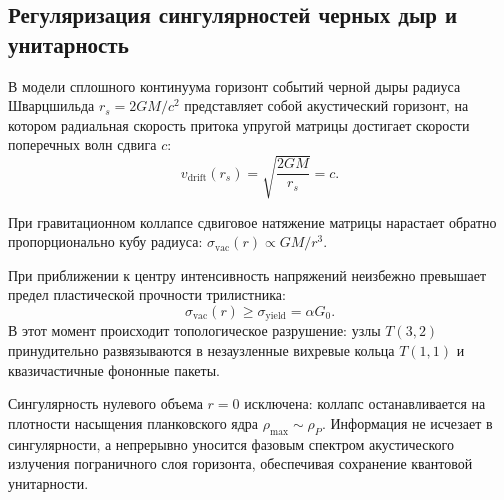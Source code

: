 \documentclass[11pt,a4paper]{article}
\theoremstyle{definition}
\theoremstyle{remark}
\begin{document}
\subsection{Регуляризация сингулярностей черных дыр и унитарность}
В модели сплошного континуума горизонт событий черной дыры радиуса Шварцшильда $r_s = 2GM/c^2$ представляет собой акустический горизонт, на котором радиальная скорость притока упругой матрицы достигает скорости поперечных волн сдвига $c$:
\begin{equation}
    v_{\mathrm{drift}}(r_s) = \sqrt{\frac{2GM}{r_s}} = c.
\end{equation}

При гравитационном коллапсе сдвиговое натяжение матрицы нарастает обратно пропорционально кубу радиуса: $\sigma_{\mathrm{vac}}(r) \propto GM / r^3$. 

При приближении к центру интенсивность напряжений неизбежно превышает предел пластической прочности трилистника:
\begin{equation}
    \sigma_{\mathrm{vac}}(r) \ge \sigma_{\mathrm{yield}} = \alpha G_0.
\end{equation}
В этот момент происходит топологическое разрушение: узлы $T(3,2)$ принудительно развязываются в незаузленные вихревые кольца $T(1,1)$ и квазичастичные фононные пакеты. 

Сингулярность нулевого объема $r=0$ исключена: коллапс останавливается на плотности насыщения планковского ядра $\rho_{\max} \sim \rho_P$. Информация не исчезает в сингулярности, а непрерывно уносится фазовым спектром акустического излучения пограничного слоя горизонта, обеспечивая сохранение квантовой унитарности.
\end{document}

